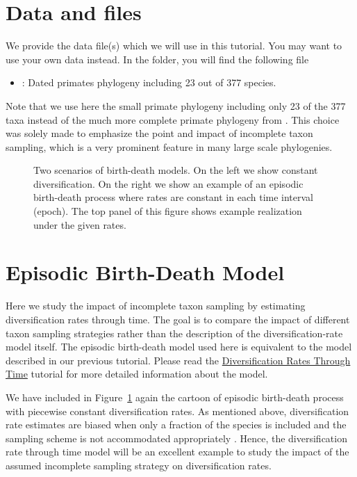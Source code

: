 \section{Data and files}

We provide the data file(s) which we will use in this tutorial.
You may want to use your own data instead.
In the  folder, you will find the following file
\begin{itemize}
\item {}: Dated primates phylogeny including 23 out of 377 species.
\end{itemize}
Note that we use here the small primate phylogeny including only 23 of the 377 taxa instead of the much more complete primate phylogeny from \cite{Springer2012}.
This choice was solely made to emphasize the point and impact of incomplete taxon sampling, which is a very prominent feature in many large scale phylogenies.


\begin{figure}[!h]
\centering
{}
\caption{\small Two scenarios of birth-death models. On the left we show constant diversification. On the right we show an example of an episodic birth-death process where rates are constant in each time interval (epoch). The top panel of this figure shows example realization under the given rates.}
\label{fig:EBD}
\end{figure}

\bigskip
\section{Episodic Birth-Death Model}

Here we study the impact of incomplete taxon sampling by estimating diversification rates through time.
The goal is to compare the impact of different taxon sampling strategies rather than the description of the diversification-rate model itself.
The episodic birth-death model used here is equivalent to the model described in our previous tutorial.
Please read the \href{https://github.com/revbayes/revbayes_tutorial/raw/master/tutorial_TeX/RB_DiversificationRate_Episodic_Tutorial/RB_DiversificationRate_Episodic_Tutorial.pdf}{Diversification Rates Through Time} tutorial for more detailed information about the model.

We have included in Figure~\ref{fig:EBD} again the cartoon of episodic birth-death process with piecewise constant diversification rates.
As mentioned above, diversification rate estimates are biased when only a fraction of the species is included and the sampling scheme is not accommodated appropriately \citep{Cusimano2010,Hoehna2011,Cusimano2012,Hoehna2014a}.
Hence, the diversification rate through time model will be an excellent example to study the impact of the assumed incomplete sampling strategy on diversification rates.

